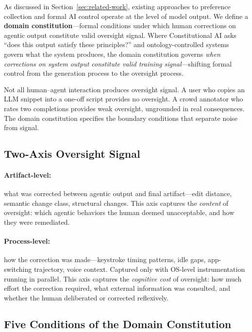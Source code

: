 \documentclass[11pt]{article}
\begin{document}
As discussed in Section~\ref{sec:related-work}, existing approaches to preference collection and formal AI control operate at the level of model output.
We define a \textbf{domain constitution}---formal conditions under which human corrections on agentic output constitute valid oversight signal.
Where Constitutional AI asks ``does this output satisfy these principles?'' and ontology-controlled systems govern what the system produces, the domain constitution governs \emph{when corrections on system output constitute valid training signal}---shifting formal control from the generation process to the oversight process.

Not all human--agent interaction produces oversight signal.
A user who copies an LLM snippet into a one-off script provides no oversight.
A crowd annotator who rates two completions provides weak oversight, ungrounded in real consequences.
The domain constitution specifies the boundary conditions that separate noise from signal.

\subsection{Two-Axis Oversight Signal}

\paragraph{Artifact-level:} what was corrected between agentic output and final artifact---edit distance, semantic change class, structural changes.
This axis captures the \emph{content} of oversight: which agentic behaviors the human deemed unacceptable, and how they were remediated.

\paragraph{Process-level:} how the correction was made---keystroke timing patterns, idle gaps, app-switching trajectory, voice context.
Captured only with OS-level instrumentation running in parallel.
This axis captures the \emph{cognitive cost} of oversight: how much effort the correction required, what external information was consulted, and whether the human deliberated or corrected reflexively.

\subsection{Five Conditions of the Domain Constitution}
\label{sec:five-conditions}
\end{document}
